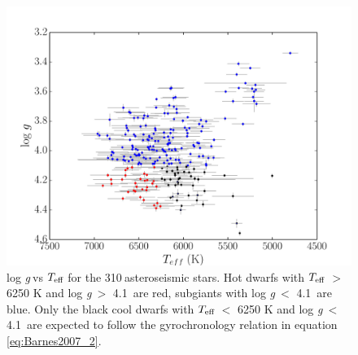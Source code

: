 \documentclass[11pt,preprint]{aastex}
\newcommand{\logg}{log \emph{g}}
\newcommand{\teff}{$T_{\rm{eff}}$}
\newcommand{\nastero}{310}
\newcommand{\subcut}{4.1~}
\begin{document}
\begin{figure}[ht]
\begin{center}
\includegraphics[width=6in, clip=true, trim=0 0 0.5in 0]{logg_vs_t_paper.pdf}
\caption{\logg$~$vs \teff$~$for the \nastero$~$asteroseismic stars. Hot dwarfs
with \teff$~>$ 6250 K and \logg$~>$ \subcut are red, subgiants with \logg$~<$
\subcut are blue. Only the black cool dwarfs with \teff$~<$ 6250 K and
\logg$~<$ \subcut are expected to follow the gyrochronology relation in
equation \ref{eq:Barnes2007_2}.
\label{fig:logg_vs_t}}
\end{center}
\end{figure}
\end{document}
